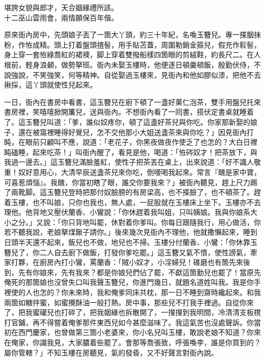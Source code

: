 \begin{myquote}
堪誇女貌與郎才，天合姻緣禮所該。\\十二巫山雲雨會，兩情願保百年偕。
\end{myquote}

原來衙內房中，先頭娘子丟了一箇大丫頭，約三十年紀，名喚玉簪兒。專一搽胭抹粉，作恠成精。頭上打着盤頭揸髻，用手貼苫蓋，周圍勒銷金箍兒，假充作鬏髻，{}身上穿一套恠綠喬紅的裙襖，脚上穿着雙撥船樣四箇眼的剪絨鞋，約長尺二。在人根前，輕身浪顙，做勢拏班。衙內未娶玉樓時，他便逐日頓羹頓飯，殷勤伏侍，不說強說，不笑強笑，何等精神。自從娶過玉樓來，見衙內和他如膠似漆，把他不去揪採，這丫頭就使性兒起來。

一日，衙內在書房中看書，這玉簪兒在廚下頓了一盞好菓仁泡茶，雙手用盤兒托來書房裡，笑嘻嘻掀開簾兒，送與衙內。不想衙內看了一囘書，搭伏定書桌就睡着了。{}這玉簪兒叫道：「爹，誰似奴疼你，頓了這盞好茶兒與你吃。你家那新娶的娘子，還在被窩裡睡得好覺兒，怎不交他那小大姐送盞茶來與你吃？」因見衙內打盹，在眼前只顧叫不應，說道：「老花子，你黑夜做夜作使乏了也怎的？大白日裡盹磕睡，起來吃茶！」叫衙內醒了，看見是他，喝道：「恠硶奴才！把茶放下，與我過一邊去。」這玉簪兒滿臉羞紅，使性子把茶丟在桌上，出來說道：「好不識人敬重！奴好意用心，大清早辰送盞茶兒來你吃，倒喓喝我起來。常言『醜是家中寶，可喜惹煩惱』。我醜，你當初瞎了眼，誰交你要我來？」{}被衙內聽見，趕上尺力踢了兩靴脚。這玉簪兒登時把那付奴臉膀的有房梁高，也不搽臉了，也不頓茶了。趕着玉樓，也不叫娘，只你也我也，無人處，一屁股就在玉樓床上坐下。玉樓亦不去理他。他背地又壓伏蘭香、小鸞說：「你休趕着我叫姐，只叫姨娘。我與你娘系大小之分。」{}又說：「你只背地叫罷，休對着你爹叫。{}你每日跟隨我行，用心做活，你若不聽我說，老娘拏煤鍬子請你。」{}後來幾次見衙內不理他，他就撒懶起來，睡到日頭半天還不起來，飯兒也不做，地兒也不掃。玉樓分付蘭香、小鸞：「你休靠玉簪兒了，你二人自去廚下做飯，打發你爹吃罷。」這玉簪又氣不憤，使性謗氣，牽家打夥，在廚房內打小鸞，罵蘭香：「賊小奴才，小淫婦兒！碓磨也有箇先來後到，先有你娘來，先有我來？都是你娘兒們佔了罷，不獻這箇勤兒也罷了！當原先俺死的那箇娘也沒曾失口叫我聲玉簪兒，你進門幾日，就題名道姓叫我。我是你手裡使的人也怎的？你未來時，我和俺爹同床共枕，那一日不睡到齋時纔起來。和我兩箇如糖拌蜜，如蜜攪酥油一般打熱。房中事，那些兒不打我手裡過。自從你來了，把我蜜礶兒也打碎了，把我姻緣也拆散開了，一攆攆到我明間，冷清清支板櫈打官鋪，再不得嘗着俺爹那件東西兒如今甚麼滋味了。{}我這氣苦也沒處聲訴。你當初在西門慶家，也曾做第三箇小老婆來，你小名兒叫玉樓，敢說老娘不知道？{}你來在俺家，你識我見，大家膿着些罷了。會那等喬張致，呼張喚李，誰是你買到的？屬你管轄？」不知玉樓在房聽見，氣的發昏，又不好聲言對衙內說。

